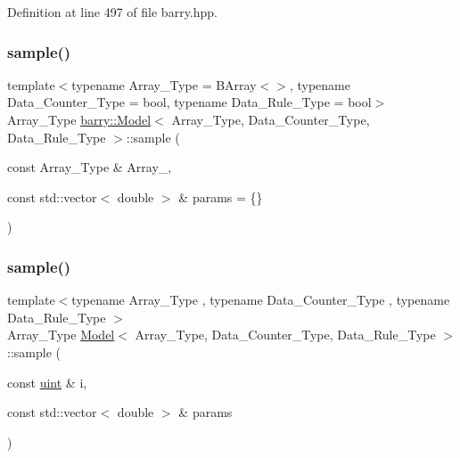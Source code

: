 Definition at line 497 of file barry.\+hpp.

\mbox{\label{classbarry_1_1_model_a1b7b9ad1362b8de49c00e7e8d5d3675e}} 
\subsubsection{\texorpdfstring{sample()}{sample()}\hspace{0.1cm}{\footnotesize\ttfamily [1/2]}}
{\footnotesize\ttfamily template$<$typename Array\+\_\+\+Type  = B\+Array$<$$>$, typename Data\+\_\+\+Counter\+\_\+\+Type  = bool, typename Data\+\_\+\+Rule\+\_\+\+Type  = bool$>$ \\
Array\+\_\+\+Type \hyperlink{classbarry_1_1_model}{barry\+::\+Model}$<$ Array\+\_\+\+Type, Data\+\_\+\+Counter\+\_\+\+Type, Data\+\_\+\+Rule\+\_\+\+Type $>$\+::sample (\begin{DoxyParamCaption}\item[{const Array\+\_\+\+Type \&}]{Array\+\_\+,  }\item[{const std\+::vector$<$ double $>$ \&}]{params = {\ttfamily \{\}} }\end{DoxyParamCaption})}

\mbox{\label{classbarry_1_1_model_a7fb66a67707f610b70ee05b814373f49}} 
\subsubsection{\texorpdfstring{sample()}{sample()}\hspace{0.1cm}{\footnotesize\ttfamily [2/2]}}
{\footnotesize\ttfamily template$<$typename Array\+\_\+\+Type , typename Data\+\_\+\+Counter\+\_\+\+Type , typename Data\+\_\+\+Rule\+\_\+\+Type $>$ \\
Array\+\_\+\+Type \hyperlink{classbarry_1_1_model}{Model}$<$ Array\+\_\+\+Type, Data\+\_\+\+Counter\+\_\+\+Type, Data\+\_\+\+Rule\+\_\+\+Type $>$\+::sample (\begin{DoxyParamCaption}\item[{const \hyperlink{namespacebarry_a11dfc53ddb4672278319aa04f1e09a6c}{uint} \&}]{i,  }\item[{const std\+::vector$<$ double $>$ \&}]{params }\end{DoxyParamCaption})\hspace{0.3cm}{\ttfamily [inline]}}



